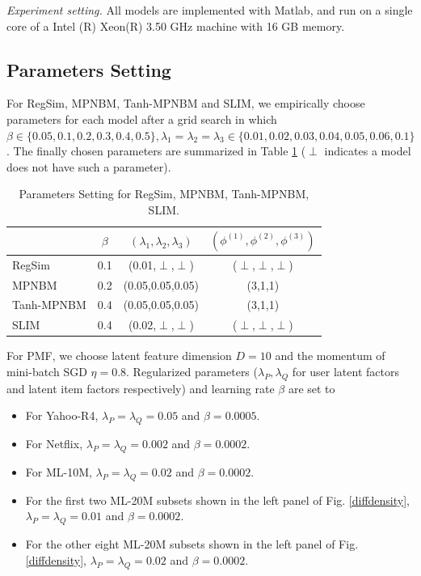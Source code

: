 \documentclass[conference]{IEEEtran}
\begin{document}
\emph{Experiment setting.} All models are implemented with Matlab, and run on a single core of a Intel (R) Xeon(R) 3.50 GHz machine with 16 GB memory. %

\subsection{Parameters Setting}
For RegSim, MPNBM, Tanh-MPNBM and SLIM,
we empirically choose parameters for each model after a grid search in which $\beta \in \{0.05, 0.1, 0.2, 0.3, 0.4, 0.5\}, \lambda_1=\lambda_2=\lambda_3 \in \{0.01, 0.02, 0.03, 0.04, 0.05, 0.06, 0.1\}$. The finally chosen parameters are summarized in Table \ref{setpara} ($\perp$ indicates a model does not have such a parameter).
\begin{table}[!ht]
\centering
\caption{Parameters Setting for RegSim, MPNBM, Tanh-MPNBM, SLIM.}
\begin{tabular}{|l|c|c|c|}
\hline
           & $\beta$ & $(\lambda_1,\lambda_2,\lambda_3)$ & $(\phi^{(1)},\phi^{(2)},\phi^{(3)})$ \\ \hline
RegSim       & 0.1     & (0.01,$\perp$,$\perp$)           & ($\perp$,$\perp$,$\perp$)                              \\ \hline
MPNBM      & 0.2     & (0.05,0.05,0.05)                 & (3,1,1)                                                \\ \hline
Tanh-MPNBM & 0.4     & (0.05,0.05,0.05)                 & (3,1,1)                                                \\ \hline
SLIM    & 0.4     & (0.02,$\perp$,$\perp$)           & ($\perp$,$\perp$,$\perp$)                              \\ \hline
\end{tabular}

\label{setpara}
\end{table}

For PMF,  we choose latent feature dimension $D=10$ and the momentum of mini-batch SGD $\eta=0.8$. Regularized parameters ($\lambda_P, \lambda_Q$ for user latent factors and latent item factors respectively) and learning rate $\beta$ are set to

\begin{itemize}
\item For Yahoo-R4, $\lambda_P=\lambda_Q=0.05$ and $\beta=0.0005$.
\item For Netflix, $\lambda_P=\lambda_Q=0.002$ and $\beta=0.0002$.
\item For ML-10M, $\lambda_P=\lambda_Q=0.02$ and $\beta=0.0002$.
\item For the first two ML-20M subsets shown in the left panel of Fig. \ref{diffdensity}, $\lambda_P=\lambda_Q=0.01$ and $\beta=0.0002$.
\item For the other eight ML-20M subsets shown in the left panel of Fig. \ref{diffdensity}, $\lambda_P=\lambda_Q=0.02$ and $\beta=0.0002$.
\end{itemize}
\end{document}
